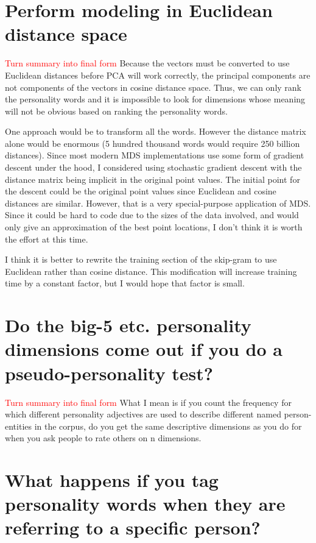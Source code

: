\documentclass[10pt,letterpaper]{book}
\newcommand{\todo}[1]{\textcolor{red}{#1}}
\begin{document}
\section{Perform modeling in Euclidean distance space}

\todo{Turn summary into final form}
Because the vectors must be converted to use Euclidean distances before PCA will work correctly, the principal components are not components of the vectors in cosine distance space. Thus, we can only rank the personality words and it is impossible to look for dimensions whose meaning will not be obvious based on ranking the personality words.

One approach would be to transform all the words. However the distance matrix alone would be enormous (5 hundred thousand words would require 250 billion distances). Since most modern MDS implementations use some form of gradient descent under the hood, I considered using stochastic gradient descent with the distance matrix being implicit in the original point values. The initial point for the descent could be the original point values since Euclidean and cosine distances are similar. However, that is a very special-purpose application of MDS. Since it could be hard to code due to the sizes of the data involved, and would only give an approximation of the best point locations, I don't think it is worth the effort at this time.

I think it is better to rewrite the training section of the skip-gram to use Euclidean rather than cosine distance. This modification will increase training time by a constant factor, but I would hope that factor is small.

\section{Do the big-5 etc. personality dimensions come out if you do a pseudo-personality test?}
\todo{Turn summary into final form}
What I mean is if you count the frequency for which different personality adjectives are used to describe different named person-entities in the corpus, do you get the same descriptive dimensions as you do for when you ask people to rate others on n dimensions.

\section{What happens if you tag personality words when they are referring to a specific person?}
\end{document}
